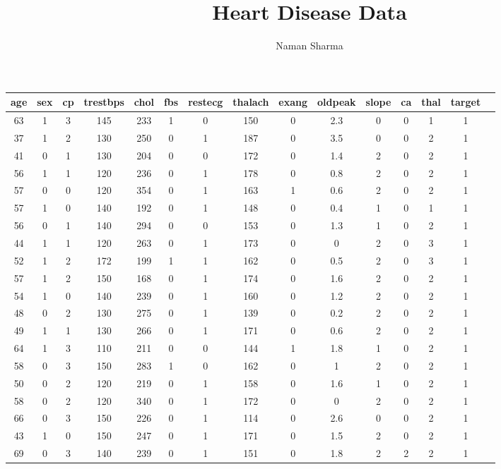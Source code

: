 \documentclass{article}
\title{Heart Disease Data}
\author{Naman Sharma}
\begin{document}
\maketitle
\begin{longtable}{
|
c|c|c|c|c|c|c|c|c|c|c|c|c|c|c|}
\hline
age & sex & cp & trestbps & chol & fbs & restecg & thalach & exang & oldpeak & slope & ca & thal & target \\
\hline
\endfirsthead
\hline
63 & 1 & 3 & 145 & 233 & 1 & 0 & 150 & 0 & 2.3 & 0 & 0 & 1 & 1 \\
\hline
37 & 1 & 2 & 130 & 250 & 0 & 1 & 187 & 0 & 3.5 & 0 & 0 & 2 & 1 \\
\hline
41 & 0 & 1 & 130 & 204 & 0 & 0 & 172 & 0 & 1.4 & 2 & 0 & 2 & 1 \\
\hline
56 & 1 & 1 & 120 & 236 & 0 & 1 & 178 & 0 & 0.8 & 2 & 0 & 2 & 1 \\
\hline
57 & 0 & 0 & 120 & 354 & 0 & 1 & 163 & 1 & 0.6 & 2 & 0 & 2 & 1 \\
\hline
57 & 1 & 0 & 140 & 192 & 0 & 1 & 148 & 0 & 0.4 & 1 & 0 & 1 & 1 \\
\hline
56 & 0 & 1 & 140 & 294 & 0 & 0 & 153 & 0 & 1.3 & 1 & 0 & 2 & 1 \\
\hline
44 & 1 & 1 & 120 & 263 & 0 & 1 & 173 & 0 & 0 & 2 & 0 & 3 & 1 \\
\hline
52 & 1 & 2 & 172 & 199 & 1 & 1 & 162 & 0 & 0.5 & 2 & 0 & 3 & 1 \\
\hline
57 & 1 & 2 & 150 & 168 & 0 & 1 & 174 & 0 & 1.6 & 2 & 0 & 2 & 1 \\
\hline
54 & 1 & 0 & 140 & 239 & 0 & 1 & 160 & 0 & 1.2 & 2 & 0 & 2 & 1 \\
\hline
48 & 0 & 2 & 130 & 275 & 0 & 1 & 139 & 0 & 0.2 & 2 & 0 & 2 & 1 \\
\hline
49 & 1 & 1 & 130 & 266 & 0 & 1 & 171 & 0 & 0.6 & 2 & 0 & 2 & 1 \\
\hline
64 & 1 & 3 & 110 & 211 & 0 & 0 & 144 & 1 & 1.8 & 1 & 0 & 2 & 1 \\
\hline
58 & 0 & 3 & 150 & 283 & 1 & 0 & 162 & 0 & 1 & 2 & 0 & 2 & 1 \\
\hline
50 & 0 & 2 & 120 & 219 & 0 & 1 & 158 & 0 & 1.6 & 1 & 0 & 2 & 1 \\
\hline
58 & 0 & 2 & 120 & 340 & 0 & 1 & 172 & 0 & 0 & 2 & 0 & 2 & 1 \\
\hline
66 & 0 & 3 & 150 & 226 & 0 & 1 & 114 & 0 & 2.6 & 0 & 0 & 2 & 1 \\
\hline
43 & 1 & 0 & 150 & 247 & 0 & 1 & 171 & 0 & 1.5 & 2 & 0 & 2 & 1 \\
\hline
69 & 0 & 3 & 140 & 239 & 0 & 1 & 151 & 0 & 1.8 & 2 & 2 & 2 & 1 \\

\end{longtable}
\end{document}

